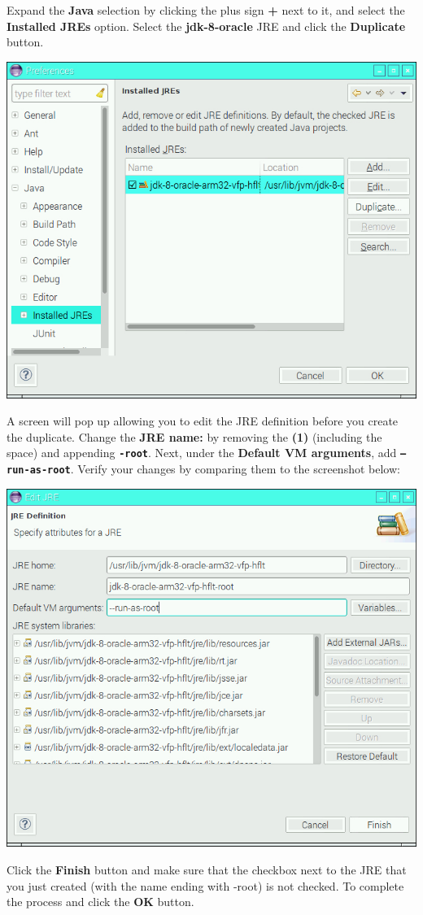 Expand the \textbf{Java} selection by clicking the plus sign \textbf{+} next to it, and select the \textbf{Installed JREs} option. Select the \textbf{jdk-8-oracle} JRE and click the \textbf{Duplicate} button.

\beforefig
\centerline{\includegraphics[height=3.0 in]{pi_images/setup/ConfigureEclipse5.jpg}}
\afterfig

A screen will pop up allowing you to edit the JRE definition before you create the duplicate. Change the \textbf{JRE name:} by removing the \textbf{(1)} (including the space) and appending \textbf{\texttt{-root}}. Next, under the \textbf{Default VM arguments}, add \textbf{\texttt{--run-as-root}}. Verify your changes by comparing them to the screenshot below:

\beforefig
\centerline{\includegraphics[height=3.0 in]{pi_images/setup/ConfigureEclipse6.jpg}}
\afterfig

Click the \textbf{Finish} button and make sure that the checkbox next to the JRE that you just created (with the name ending with -root) is not checked. To complete the process and click the \textbf{OK} button.

